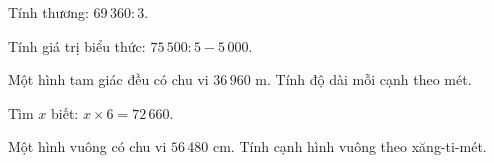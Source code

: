 \begin{ex} %
Tính thương: $69\,360 : 3$.
\end{ex}

\begin{ex} %
Tính giá trị biểu thức: $75\,500 : 5 - 5\,000$.
\end{ex}

\begin{ex} %
Một hình tam giác đều có chu vi $36\,960\text{ m}$. Tính độ dài mỗi cạnh theo mét.
\end{ex}

\begin{ex} %
Tìm $x$ biết: $x \times 6 = 72\,660$.
\end{ex}

\begin{ex} %
Một hình vuông có chu vi $56\,480\text{ cm}$. Tính cạnh hình vuông theo xăng-ti-mét.
\end{ex}

